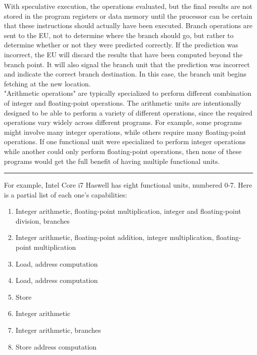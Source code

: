 \documentclass[11pt]{article}
\begin{document}
With speculative execution, the operations evaluated, but the final results are not stored in the program registers or data memory until the processor can be certain that these instructions should actually have been executed. Branch operations are sent to the EU, not to determine where the branch should go, but rather to determine whether or not they were predicted correctly. If the prediction was incorrect, the EU will discard the results that have been computed beyond the branch point. It will also signal the branch unit that the prediction was incorrect and indicate the correct branch destination. In this case, the branch unit begins fetching at the new location.\\

"Arithmetic operations" are typically specialized to perform different combination of integer and floating-point operations. The arithmetic units are intentionally designed to be able to perform a variety of different operations, since the required operations vary widely across different programs. For example, some programs might involve many integer operations, while others require many floating-point operations. If one functional unit were specialized to perform integer operations while another could only perform floating-point operations, then none of these programs would get the full benefit of having multiple functional units.\\


\noindent\rule{\textwidth}{0.5pt}
For example, Intel Core i7 Haswell has eight functional units, numbered 0-7. Here is a partial list of each one's capabilities:\\
\begin{enumerate}
\item Integer arithmetic, floating-point multiplication, integer and floating-point division, branches\\
\item Integer arithmetic, floating-point addition, integer multiplication, floating-point multiplication\\
\item Load, address computation\\
\item Load, address computation\\
\item Store\\
\item Integer arithmetic\\
\item Integer arithmetic, branches\\
\item Store address computation\\
\end{enumerate}
\end{document}
